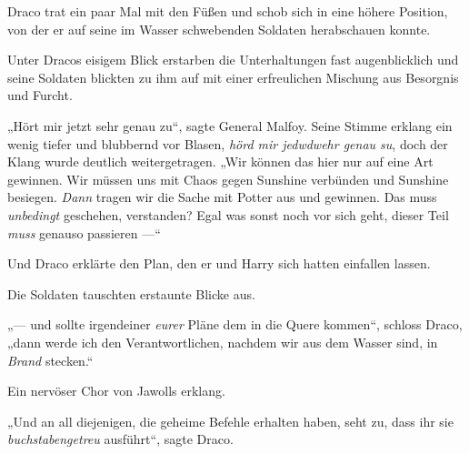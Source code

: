 Draco trat ein paar Mal mit den Füßen und schob sich in eine höhere Position, von der er auf seine im Wasser schwebenden Soldaten herabschauen konnte.

Unter Dracos eisigem Blick erstarben die Unterhaltungen fast augenblicklich und seine Soldaten blickten zu ihm auf mit einer erfreulichen Mischung aus Besorgnis und Furcht.

„Hört mir jetzt sehr genau zu“, sagte General Malfoy. Seine Stimme erklang ein wenig tiefer und blubbernd vor Blasen, \emph{hörd mir jedwdwehr genau su}, doch der Klang wurde deutlich weitergetragen.
„Wir können das hier nur auf eine Art gewinnen. Wir müssen uns mit Chaos gegen Sunshine verbünden und Sunshine besiegen. \emph{Dann} tragen wir die Sache mit Potter aus und gewinnen. Das muss \emph{unbedingt} geschehen, verstanden? Egal was sonst noch vor sich geht, dieser Teil \emph{muss} genauso passieren —“

Und Draco erklärte den Plan, den er und Harry sich hatten einfallen lassen.

Die Soldaten tauschten erstaunte Blicke aus.

„— und sollte irgendeiner \emph{eurer} Pläne dem in die Quere kommen“, schloss Draco, „dann werde ich den Verantwortlichen, nachdem wir aus dem Wasser sind, in \emph{Brand} stecken.“

Ein nervöser Chor von Jawolls erklang.

„Und an all diejenigen, die geheime Befehle erhalten haben, seht zu, dass ihr sie \emph{buchstabengetreu} ausführt“, sagte Draco.


